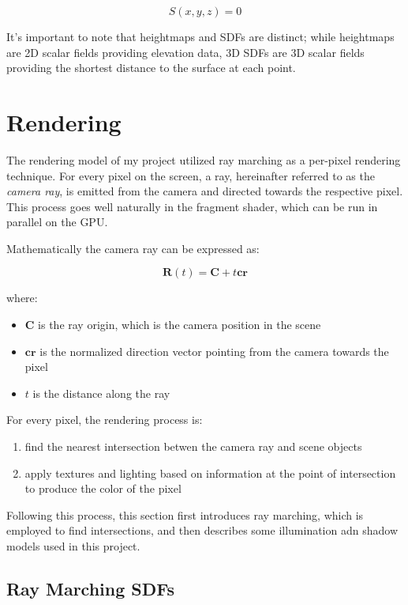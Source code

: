 \begin{equation}
S(x,y,z) = 0 
\end{equation}

It's important to note that heightmaps and SDFs are distinct; while heightmaps are 2D scalar fields providing elevation data, 3D SDFs are 3D scalar fields providing the shortest distance to the surface at each point. 


\section{Rendering}
\label{Rendering}

The rendering model of my project utilized ray marching as a per-pixel rendering technique. For every pixel on the screen, a ray, hereinafter referred to as the \textit{camera ray}, is emitted from the camera and directed towards the respective pixel. This process goes well naturally in the fragment shader, which can be run in parallel on the GPU.

Mathematically the camera ray can be expressed as:

\begin{equation}
 \mathbf{R}(t) = \mathbf{C} + t\mathbf{cr} 
\end{equation}

where:
\begin{itemize}
    \item $\mathbf{C}$ is the ray origin, which is the camera position in the scene
    \item $\mathbf{cr}$ is the normalized direction vector pointing from the camera towards the pixel
    \item $t$ is the distance along the ray
\end{itemize}

For every pixel, the rendering process is:
\begin{enumerate}
    \item find the nearest intersection betwen the camera ray and scene objects
    \item apply textures and lighting based on information at the point of intersection to produce the color of the pixel
\end{enumerate}

Following this process, this section first introduces ray marching, which is employed to find intersections, and then describes some illumination adn shadow models used in this project.

\subsection{Ray Marching SDFs}
\label{Raymarching SDFs}

